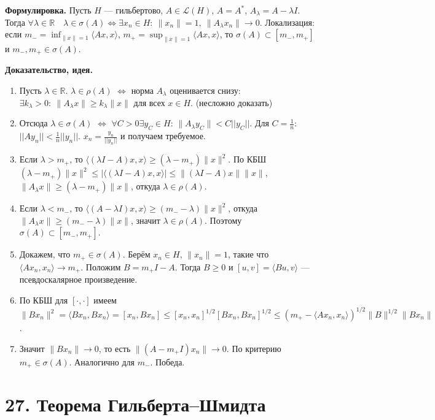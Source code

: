 \documentclass[10pt,a4paper]{article}
\begin{document}
	\textbf{Формулировка.} Пусть $H$ --- гильбертово, $A\in\mathcal L(H)$, $A=A^*$, $A_\lambda=A-\lambda I$. Тогда $\forall\lambda\in\mathbb R\quad \lambda\in\sigma(A)\Longleftrightarrow \exists x_n\in H:\ \|x_n\|=1,\ \|A_\lambda x_n\|\to0$. Локализация: если $m_-=\inf_{\|x\|=1}\langle Ax,x\rangle$, $m_+=\sup_{\|x\|=1}\langle Ax,x\rangle$, то $\sigma(A)\subset[m_-,m_+]$ и $m_-,m_+\in\sigma(A)$.

	\textbf{Доказательство, идея.}
	\begin{enumerate}
		\item Пусть $\lambda\in\mathbb R$. $\lambda\in\rho(A)$ $\Longleftrightarrow$ норма $A_\lambda$ оценивается снизу: $\exists k_\lambda>0:\ \|A_\lambda x\|\ge k_\lambda\|x\|$ для всех $x\in H$. (несложно доказать)

		\item Отсюда $\lambda\in\sigma(A)$ $\Longleftrightarrow$ $\forall C>0 \exists y_C\in H$: $\|A_\lambda y_C\|<C||y_C||$. Для $C=\frac1n$: $||A y_n|| < \frac 1 n ||y_n||$. $x_n = \frac{y_n}{||y_n||}$ и получаем требуемое.

		\item Если $\lambda>m_+$, то $\langle(\lambda I-A)x,x\rangle\ge(\lambda-m_+)\|x\|^2$. По КБШ $(\lambda-m_+)\|x\|^2\le|\langle(\lambda I-A)x,x\rangle|\le\|(\lambda I-A)x\|\|x\|$, $\|A_\lambda x\|\ge(\lambda-m_+)\|x\|$, откуда $\lambda\in\rho(A)$.

		\item Если $\lambda<m_-$, то $\langle(A-\lambda I)x,x\rangle\ge(m_- - \lambda)\|x\|^2$, откуда $\|A_\lambda x\|\ge(m_- - \lambda)\|x\|$, значит $\lambda\in\rho(A)$. Поэтому $\sigma(A)\subset[m_-,m_+]$.

		\item Докажем, что $m_+\in\sigma(A)$. Берём $x_n\in H$, $\|x_n\|=1$, такие что $\langle Ax_n,x_n\rangle\to m_+$. Положим $B=m_+I-A$. Тогда $B\ge0$ и $[u,v]=\langle Bu,v\rangle$ --- псевдоскалярное произведение.

		\item По КБШ для $[\cdot,\cdot]$ имеем $\|Bx_n\|^2=\langle Bx_n,Bx_n\rangle=[x_n,Bx_n]\le [x_n,x_n]^{1/2}[Bx_n,Bx_n]^{1/2}\le (m_+-\langle Ax_n,x_n\rangle)^{1/2}\|B\|^{1/2}\|Bx_n\|$.

		\item Значит $\|Bx_n\|\to0$, то есть $\|(A-m_+I)x_n\|\to0$. По критерию $m_+\in\sigma(A)$. Аналогично для $m_-$. Победа.
	\end{enumerate}
	\section*{27. Теорема Гильберта--Шмидта}
\end{document}
